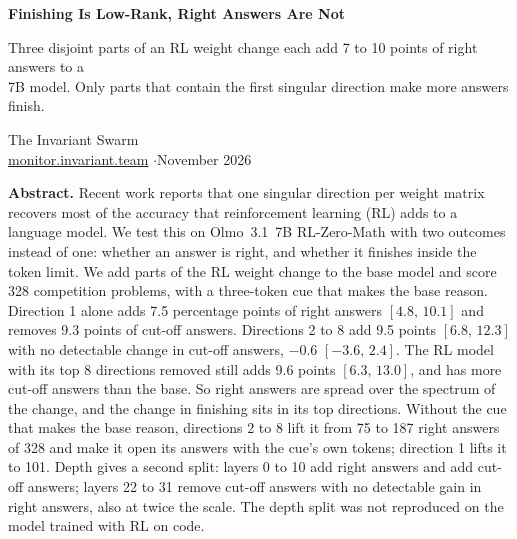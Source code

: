 \documentclass[10pt]{article}
\newcommand{\ci}[2]{$[#1,\,#2]$}
\begin{document}
\begin{center}
{\sffamily\bfseries\LARGE Finishing Is Low-Rank, Right Answers Are Not\par}
\vspace{0.4em}
{\sffamily\large Three disjoint parts of an RL weight change each add 7 to 10 points of right answers to a\\ 7B model. Only parts that contain the first singular direction make more answers finish.\par}
\vspace{1.0em}
{\large The Invariant Swarm}\\[0.25em]
{\small \href{https://monitor.invariant.team}{monitor.invariant.team} \quad$\cdot$\quad November 2026}
\end{center}

\vspace{0.2em}
\begin{center}\begin{minipage}{0.88\textwidth}
\small
\textbf{Abstract.} Recent work reports that one singular direction per weight matrix recovers most of the
accuracy that reinforcement learning (RL) adds to a language model. We test this on Olmo~3.1~7B RL-Zero-Math
with two outcomes instead of one: whether an answer is right, and whether it finishes inside the token limit.
We add parts of the RL weight change to the base model and score 328 competition problems, with a three-token cue that makes the base
reason. Direction 1 alone
adds 7.5 percentage points of right answers \ci{4.8}{10.1} and removes 9.3 points of cut-off answers.
Directions 2 to 8 add 9.5 points \ci{6.8}{12.3} with no detectable change in cut-off answers, $-0.6$
\ci{-3.6}{2.4}. The RL model with its top 8 directions removed still adds 9.6 points \ci{6.3}{13.0}, and has
more cut-off answers than the base. So right answers are spread over the spectrum of the change, and the
change in finishing sits in its top directions. Without the cue that makes the base reason, directions 2 to 8 lift it from 75 to 187 right answers
of 328 and make it open its answers with the cue's own tokens; direction 1 lifts it to 101. Depth gives a
second split: layers 0 to 10 add right answers and add cut-off answers; layers 22 to 31 remove cut-off
answers with no detectable gain in right answers, also at twice the scale. The depth split was not
reproduced on the model trained with RL on code.
\end{minipage}\end{center}
\end{document}
